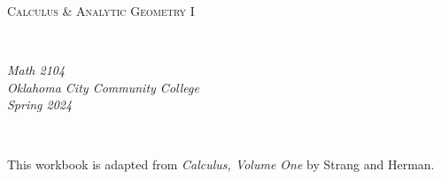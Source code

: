 \documentclass[notes]{subfiles}
\begin{document}
\rhead{}
\lhead{}
\chead{}
\thispagestyle{empty}
\[\]
\vspace{1in}
\begin{center}
	\begin{Huge}
		\textsc{Calculus \& Analytic Geometry I}
	\end{Huge}\\
		\vspace{2in}
	\begin{Large}
		\emph{Math 2104}\\
		\emph{Oklahoma City Community College}\\
		\emph{Spring 2024}
	\end{Large}\\
\end{center}
\vspace{2in}
\begin{center}
	This workbook is adapted from \emph{Calculus, Volume One} by Strang and Herman.
\end{center}
\newpage
\thispagestyle{empty}
	\[\]
\end{document}
